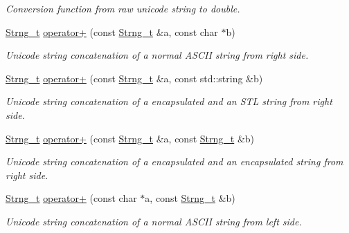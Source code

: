 \begin{DoxyCompactItemize}
\begin{DoxyCompactList}\small\item\em Conversion function from raw unicode string to double. \item\end{DoxyCompactList}\item 
\hyperlink{class_d_d4hep_1_1_x_m_l_1_1_strng__t}{Strng\_\-t} \hyperlink{group___d_d4_h_e_p___x_m_l_gad7c5e5c9ad994b97f08eec6e7829e23f}{operator+} (const \hyperlink{class_d_d4hep_1_1_x_m_l_1_1_strng__t}{Strng\_\-t} \&a, const char $\ast$b)
\begin{DoxyCompactList}\small\item\em Unicode string concatenation of a normal ASCII string from right side. \item\end{DoxyCompactList}\item 
\hyperlink{class_d_d4hep_1_1_x_m_l_1_1_strng__t}{Strng\_\-t} \hyperlink{group___d_d4_h_e_p___x_m_l_gaf514b02eb314678df1b7149c4f0025b2}{operator+} (const \hyperlink{class_d_d4hep_1_1_x_m_l_1_1_strng__t}{Strng\_\-t} \&a, const std::string \&b)
\begin{DoxyCompactList}\small\item\em Unicode string concatenation of a encapsulated and an STL string from right side. \item\end{DoxyCompactList}\item 
\hyperlink{class_d_d4hep_1_1_x_m_l_1_1_strng__t}{Strng\_\-t} \hyperlink{group___d_d4_h_e_p___x_m_l_ga16907b7f06827dc354d29834328834f8}{operator+} (const \hyperlink{class_d_d4hep_1_1_x_m_l_1_1_strng__t}{Strng\_\-t} \&a, const \hyperlink{class_d_d4hep_1_1_x_m_l_1_1_strng__t}{Strng\_\-t} \&b)
\begin{DoxyCompactList}\small\item\em Unicode string concatenation of a encapsulated and an encapsulated string from right side. \item\end{DoxyCompactList}\item 
\hyperlink{class_d_d4hep_1_1_x_m_l_1_1_strng__t}{Strng\_\-t} \hyperlink{group___d_d4_h_e_p___x_m_l_gad9d4f784bd934ca00c54efe28b42c7d2}{operator+} (const char $\ast$a, const \hyperlink{class_d_d4hep_1_1_x_m_l_1_1_strng__t}{Strng\_\-t} \&b)
\begin{DoxyCompactList}\small\item\em Unicode string concatenation of a normal ASCII string from left side. \item\end{DoxyCompactList}\item 

\end{DoxyCompactItemize}
